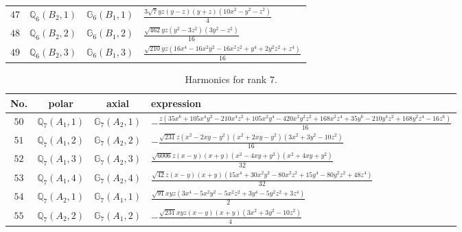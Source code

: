 \documentclass[fleqn,8pt,landscape]{jsarticle}
\begin{document}
\begin{table}[ht!]
\begin{center}
\begin{tabular}{cccl}
$ 47 $ & $ \mathbb{Q}_{6}(B_{2},1) $ & $ \mathbb{G}_{6}(B_{1},1) $ & $ \frac{3 \sqrt{7} y z \left(y - z\right) \left(y + z\right) \left(10 x^{2} - y^{2} - z^{2}\right)}{4} $ \\
$ 48 $ & $ \mathbb{Q}_{6}(B_{2},2) $ & $ \mathbb{G}_{6}(B_{1},2) $ & $ \frac{\sqrt{462} y z \left(y^{2} - 3 z^{2}\right) \left(3 y^{2} - z^{2}\right)}{16} $ \\
$ 49 $ & $ \mathbb{Q}_{6}(B_{2},3) $ & $ \mathbb{G}_{6}(B_{1},3) $ & $ \frac{\sqrt{210} y z \left(16 x^{4} - 16 x^{2} y^{2} - 16 x^{2} z^{2} + y^{4} + 2 y^{2} z^{2} + z^{4}\right)}{16} $ \\
 \hline \hline
\end{tabular}
\end{center}
\end{table}
\begin{table}[ht!]
\begin{center}
\caption{Harmonics for rank 7.}
\renewcommand{\arraystretch}{1.3}
\begin{tabular}{cccl} \hline \hline
No. & polar & axial & expression \\ \hline
$ 50 $ & $ \mathbb{Q}_{7}(A_{1},1) $ & $ \mathbb{G}_{7}(A_{2},1) $ & $ - \frac{z \left(35 x^{6} + 105 x^{4} y^{2} - 210 x^{4} z^{2} + 105 x^{2} y^{4} - 420 x^{2} y^{2} z^{2} + 168 x^{2} z^{4} + 35 y^{6} - 210 y^{4} z^{2} + 168 y^{2} z^{4} - 16 z^{6}\right)}{16} $ \\
$ 51 $ & $ \mathbb{Q}_{7}(A_{1},2) $ & $ \mathbb{G}_{7}(A_{2},2) $ & $ - \frac{\sqrt{231} z \left(x^{2} - 2 x y - y^{2}\right) \left(x^{2} + 2 x y - y^{2}\right) \left(3 x^{2} + 3 y^{2} - 10 z^{2}\right)}{16} $ \\
$ 52 $ & $ \mathbb{Q}_{7}(A_{1},3) $ & $ \mathbb{G}_{7}(A_{2},3) $ & $ \frac{\sqrt{6006} z \left(x - y\right) \left(x + y\right) \left(x^{2} - 4 x y + y^{2}\right) \left(x^{2} + 4 x y + y^{2}\right)}{32} $ \\
$ 53 $ & $ \mathbb{Q}_{7}(A_{1},4) $ & $ \mathbb{G}_{7}(A_{2},4) $ & $ \frac{\sqrt{42} z \left(x - y\right) \left(x + y\right) \left(15 x^{4} + 30 x^{2} y^{2} - 80 x^{2} z^{2} + 15 y^{4} - 80 y^{2} z^{2} + 48 z^{4}\right)}{32} $ \\
$ 54 $ & $ \mathbb{Q}_{7}(A_{2},1) $ & $ \mathbb{G}_{7}(A_{1},1) $ & $ \frac{\sqrt{91} x y z \left(3 x^{4} - 5 x^{2} y^{2} - 5 x^{2} z^{2} + 3 y^{4} - 5 y^{2} z^{2} + 3 z^{4}\right)}{2} $ \\
$ 55 $ & $ \mathbb{Q}_{7}(A_{2},2) $ & $ \mathbb{G}_{7}(A_{1},2) $ & $ - \frac{\sqrt{231} x y z \left(x - y\right) \left(x + y\right) \left(3 x^{2} + 3 y^{2} - 10 z^{2}\right)}{4} $ \\

\end{tabular}
\end{center}
\end{table}
\end{document}
